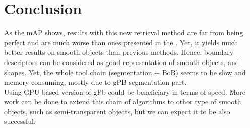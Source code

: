 \documentclass{article}
\begin{document}
\section{Conclusion}

As the mAP shows, results with this new retrieval method are far from being
perfect and are much worse than ones presented in the \cite{Arandjelovic11}. Yet, it yields much better results on smooth objects than previous
methods. Hence, boundary descriptors can be considered as good representation
of smooth objects, and shapes. Yet, the whole tool chain (segmentation + BoB)
seems to be slow and memory consuming, mostly due to gPB segmentation part. \\
Using GPU-based version of gPb could be beneficiary in terms of speed. More work can be done to extend this chain of algorithms to other type of
smooth objects, such as semi-transparent objects, but we can expect it to be
also successful. \\



\end{document}
